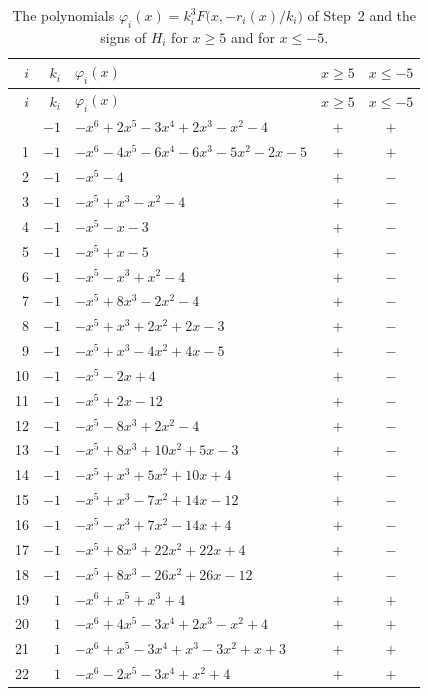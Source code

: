 \documentclass[11pt]{article}
\begin{document}
\begingroup\footnotesize
\setlength{\LTcapwidth}{\textwidth}
\begin{longtable}{@{}rrlcc@{}}
\caption{The polynomials $\varphi_i(x)=k_i^3F\bigl(x,-r_i(x)/k_i\bigr)$ of Step~2 and the signs of $H_i$ for $x\geq5$ and for $x\leq-5$.}\label{tab:phi}\\
\hline $i$ & $k_i$ & $\varphi_i(x)$ & $x\geq5$ & $x\leq-5$\\\hline\endfirsthead\hline $i$ & $k_i$ & $\varphi_i(x)$ & $x\geq5$ & $x\leq-5$\\\hline\endhead\hline\endfoot
0 & $-1$ & $-x^{6}+2x^{5}-3x^{4}+2x^{3}-x^{2}-4$ & $+$ & $+$\\
1 & $-1$ & $-x^{6}-4x^{5}-6x^{4}-6x^{3}-5x^{2}-2x-5$ & $+$ & $+$\\
2 & $-1$ & $-x^{5}-4$ & $+$ & $-$\\
3 & $-1$ & $-x^{5}+x^{3}-x^{2}-4$ & $+$ & $-$\\
4 & $-1$ & $-x^{5}-x-3$ & $+$ & $-$\\
5 & $-1$ & $-x^{5}+x-5$ & $+$ & $-$\\
6 & $-1$ & $-x^{5}-x^{3}+x^{2}-4$ & $+$ & $-$\\
7 & $-1$ & $-x^{5}+8x^{3}-2x^{2}-4$ & $+$ & $-$\\
8 & $-1$ & $-x^{5}+x^{3}+2x^{2}+2x-3$ & $+$ & $-$\\
9 & $-1$ & $-x^{5}+x^{3}-4x^{2}+4x-5$ & $+$ & $-$\\
10 & $-1$ & $-x^{5}-2x+4$ & $+$ & $-$\\
11 & $-1$ & $-x^{5}+2x-12$ & $+$ & $-$\\
12 & $-1$ & $-x^{5}-8x^{3}+2x^{2}-4$ & $+$ & $-$\\
13 & $-1$ & $-x^{5}+8x^{3}+10x^{2}+5x-3$ & $+$ & $-$\\
14 & $-1$ & $-x^{5}+x^{3}+5x^{2}+10x+4$ & $+$ & $-$\\
15 & $-1$ & $-x^{5}+x^{3}-7x^{2}+14x-12$ & $+$ & $-$\\
16 & $-1$ & $-x^{5}-x^{3}+7x^{2}-14x+4$ & $+$ & $-$\\
17 & $-1$ & $-x^{5}+8x^{3}+22x^{2}+22x+4$ & $+$ & $-$\\
18 & $-1$ & $-x^{5}+8x^{3}-26x^{2}+26x-12$ & $+$ & $-$\\
19 & $1$ & $-x^{6}+x^{5}+x^{3}+4$ & $+$ & $+$\\
20 & $1$ & $-x^{6}+4x^{5}-3x^{4}+2x^{3}-x^{2}+4$ & $+$ & $+$\\
21 & $1$ & $-x^{6}+x^{5}-3x^{4}+x^{3}-3x^{2}+x+3$ & $+$ & $+$\\
22 & $1$ & $-x^{6}-2x^{5}-3x^{4}+x^{2}+4$ & $+$ & $+$\\

\end{longtable}
\end{document}
